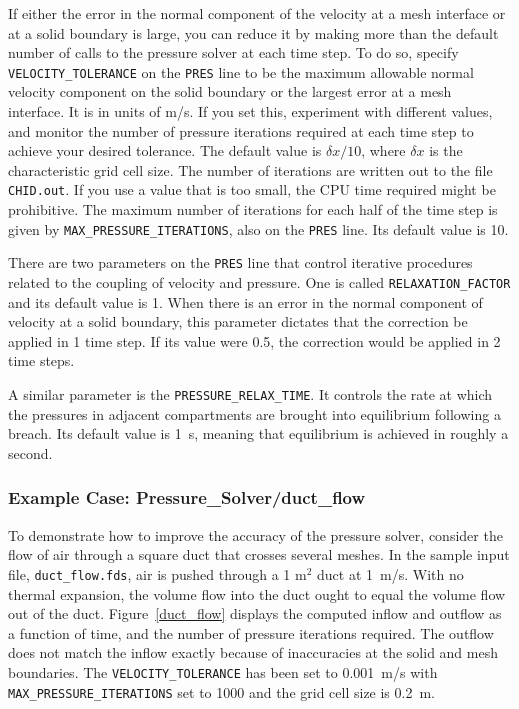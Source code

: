 \documentclass[11pt]{book}
\newcommand{\ct}{\tt\small}
\newcommand{\dx}{\delta x}
\begin{document}
If either the error in the normal component of the velocity at a mesh interface or at a solid boundary is large, you
can reduce it by making more than the default number of calls to the pressure solver at each time step.
To do so, specify {\ct VELOCITY\_TOLERANCE} on the {\ct PRES} line to be the maximum allowable normal velocity component on the solid
boundary or the largest error at a mesh interface. It is in units of m/s.
If you set this, experiment with different values, and monitor the number of pressure iterations required at each time step to achieve your
desired tolerance. The default value is $\dx/10$, where $\dx$ is the characteristic grid cell size.
The number of iterations are written out to the file {\ct CHID.out}. If you use a value that is too small, the CPU time required might be prohibitive.
The maximum number of iterations for each half of the time step is given by {\ct MAX\_PRESSURE\_ITERATIONS}, also on the {\ct PRES} line. Its default value is 10.

There are two parameters on the {\ct PRES} line that control iterative procedures related to the coupling of velocity and pressure. One is
called {\ct RELAXATION\_FACTOR} and its default value is 1. When there is an error in the normal component of velocity at a solid boundary, this
parameter dictates that the correction be applied in 1 time step. If its value were 0.5, the correction would be applied in 2 time steps.

A similar parameter is the {\ct PRESSURE\_RELAX\_TIME}. It controls the rate at which the pressures in adjacent compartments are brought into equilibrium following a
breach. Its default value is 1~s, meaning that equilibrium is achieved in roughly a second.


\subsubsection{Example Case: Pressure\_Solver/duct\_flow}

To demonstrate how to improve the accuracy of the pressure solver, consider the flow of air through a square duct that crosses several meshes. In the sample input file, {\ct duct\_flow.fds}, air is pushed through a 1 m$^2$ duct at 1~m/s. With no thermal expansion, the volume flow into the duct ought to equal the volume flow out of the
duct. Figure~\ref{duct_flow} displays the computed inflow and outflow as a function of time, and the number of pressure iterations required. The outflow does not match
the inflow exactly because of inaccuracies at the solid and mesh boundaries. The {\ct VELOCITY\_TOLERANCE} has been set to 0.001~m/s with {\ct MAX\_PRESSURE\_ITERATIONS} set to 1000 and the grid cell size is 0.2~m.
\end{document}
